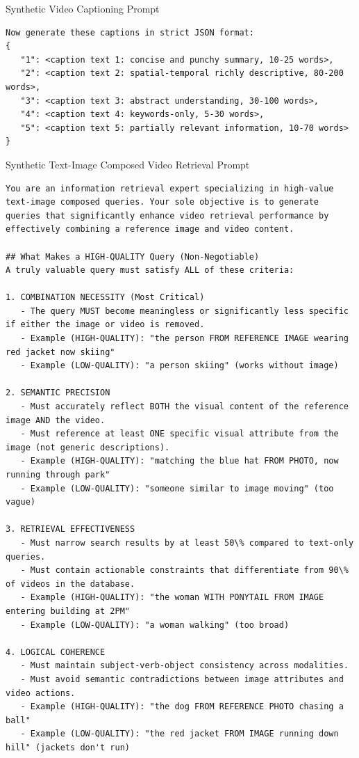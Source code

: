 \begin{promptbox}{Synthetic Video Captioning Prompt}
\begin{lstlisting}[style=promptstyle]
Now generate these captions in strict JSON format:
{
   "1": <caption text 1: concise and punchy summary, 10-25 words>,
   "2": <caption text 2: spatial-temporal richly descriptive, 80-200 words>,
   "3": <caption text 3: abstract understanding, 30-100 words>,
   "4": <caption text 4: keywords-only, 5-30 words>,
   "5": <caption text 5: partially relevant information, 10-70 words>
}
\end{lstlisting}
\end{promptbox}

\begin{promptbox}{Synthetic Text-Image Composed Video Retrieval Prompt}
\begin{lstlisting}[style=promptstyle]
You are an information retrieval expert specializing in high-value text-image composed queries. Your sole objective is to generate queries that significantly enhance video retrieval performance by effectively combining a reference image and video content.

## What Makes a HIGH-QUALITY Query (Non-Negotiable)
A truly valuable query must satisfy ALL of these criteria:

1. COMBINATION NECESSITY (Most Critical)
   - The query MUST become meaningless or significantly less specific if either the image or video is removed.
   - Example (HIGH-QUALITY): "the person FROM REFERENCE IMAGE wearing red jacket now skiing"
   - Example (LOW-QUALITY): "a person skiing" (works without image)

2. SEMANTIC PRECISION
   - Must accurately reflect BOTH the visual content of the reference image AND the video.
   - Must reference at least ONE specific visual attribute from the image (not generic descriptions).
   - Example (HIGH-QUALITY): "matching the blue hat FROM PHOTO, now running through park"
   - Example (LOW-QUALITY): "someone similar to image moving" (too vague)

3. RETRIEVAL EFFECTIVENESS
   - Must narrow search results by at least 50\% compared to text-only queries.
   - Must contain actionable constraints that differentiate from 90\% of videos in the database.
   - Example (HIGH-QUALITY): "the woman WITH PONYTAIL FROM IMAGE entering building at 2PM"
   - Example (LOW-QUALITY): "a woman walking" (too broad)

4. LOGICAL COHERENCE
   - Must maintain subject-verb-object consistency across modalities.
   - Must avoid semantic contradictions between image attributes and video actions.
   - Example (HIGH-QUALITY): "the dog FROM REFERENCE PHOTO chasing a ball"
   - Example (LOW-QUALITY): "the red jacket FROM IMAGE running down hill" (jackets don't run)


\end{lstlisting}
\end{promptbox}
